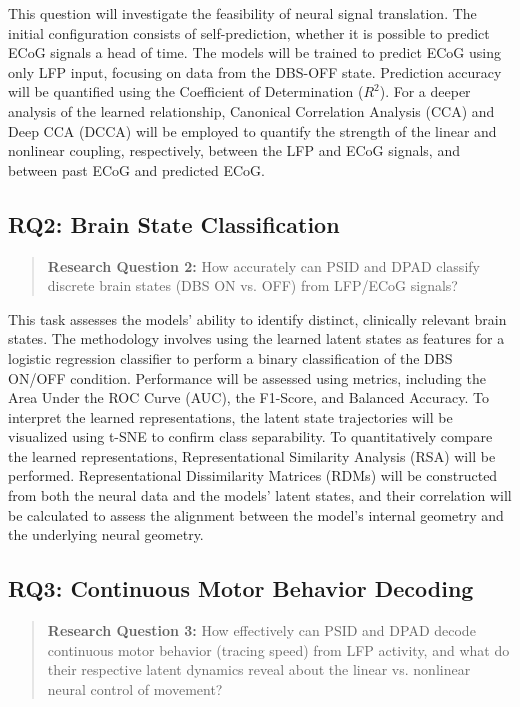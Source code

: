 \documentclass[12pt, a4paper]{article}
\begin{document}
This question will investigate the feasibility of neural signal translation. The initial configuration consists of self-prediction, whether it is possible to predict ECoG signals a head of time. The models will be trained to predict ECoG using only LFP input, focusing on data from the DBS-OFF state. Prediction accuracy will be quantified using the Coefficient of Determination ($R^2$). For a deeper analysis of the learned relationship, Canonical Correlation Analysis (CCA) and Deep CCA (DCCA) will be employed to quantify the strength of the linear and nonlinear coupling, respectively, between the LFP and ECoG signals, and between past ECoG and predicted ECoG.

\subsection{RQ2: Brain State Classification}
\begin{quote}
    \textbf{Research Question 2:} How accurately can PSID and DPAD classify discrete brain states (DBS ON vs. OFF) from LFP/ECoG signals?
\end{quote}

This task assesses the models' ability to identify distinct, clinically relevant brain states. The methodology involves using the learned latent states as features for a logistic regression classifier to perform a binary classification of the DBS ON/OFF condition. Performance will be assessed using metrics, including the Area Under the ROC Curve (AUC), the F1-Score, and Balanced Accuracy. To interpret the learned representations, the latent state trajectories will be visualized using t-SNE to confirm class separability. To quantitatively compare the learned representations, Representational Similarity Analysis (RSA) will be performed. Representational Dissimilarity Matrices (RDMs) will be constructed from both the neural data and the models' latent states, and their correlation will be calculated to assess the alignment between the model's internal geometry and the underlying neural geometry.
\subsection{RQ3: Continuous Motor Behavior Decoding}
\begin{quote}
    \textbf{Research Question 3:} How effectively can PSID and DPAD decode continuous motor behavior (tracing speed) from LFP activity, and what do their respective latent dynamics reveal about the linear vs. nonlinear neural control of movement?
\end{quote}
\end{document}
